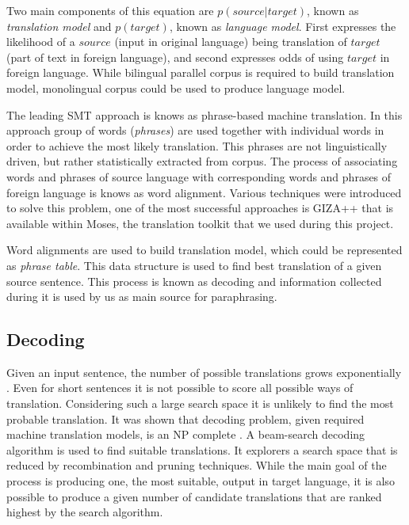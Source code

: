 Two main components of this equation are $p(source|target)$, known as \textit{translation model} and $p(target)$, known as \textit{language model}. First expresses the likelihood of a $source$ (input in original language) being translation of $target$ (part of text in foreign language), and second expresses odds of using $target$ in foreign language. While bilingual parallel corpus is required to build translation model, monolingual corpus could be used to produce language model. 

The leading SMT approach is knows as phrase-based machine translation. In this approach group of words (\textit{phrases}) are used together with individual words in order to achieve the most likely translation. This phrases are not linguistically driven, but rather statistically extracted from corpus. The process of associating words and phrases of source language with corresponding words and phrases of foreign language is knows as word alignment. Various techniques were introduced to solve this problem, one of the most successful approaches is GIZA++ that is available within Moses, the translation toolkit that we used during this project.

Word alignments are used to build translation model, which could be represented as \textit{phrase table}. This data structure is used to find best translation of a given source sentence. This process is known as decoding and information collected during it is used by us as main source for paraphrasing.

\subsection{Decoding}

Given an input sentence, the number of possible translations grows exponentially \citep{Koehn2009a}. Even for short sentences it is not possible to score all possible ways of translation. Considering such a large search space it is unlikely to find the most probable translation. It was shown that decoding problem, given required machine translation models, is an NP complete \citep{knight1999decoding}. A beam-search decoding algorithm is used to find suitable translations. It explorers a search space that is reduced by recombination and pruning techniques. While the main goal of the process is producing one, the most suitable, output in target language, it is also possible to produce a given number of candidate translations that are ranked highest by the search algorithm.

